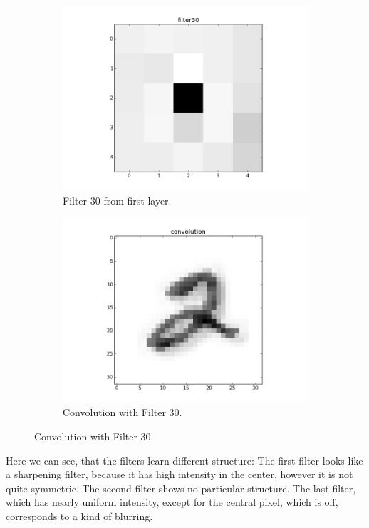 \documentclass{article}
\begin{document}
\begin{figure}[h]
	\centering
	\begin{subfigure}[b]{0.45\textwidth} 
		\includegraphics[width=\textwidth]{graphics/filt2.png}
		\caption{Filter 30 from first layer.}
		\label{fig8}
	\end{subfigure}
	\begin{subfigure}[b]{0.45\textwidth} 
		\includegraphics[width=\textwidth]{graphics/conv2.png}
		\caption{Convolution with Filter 30.}
		\label{fig9}
	\end{subfigure}
\end{figure}

\FloatBarrier

Here we can see, that the filters learn different structure: 
The first filter looks like a sharpening filter, because it has high intensity in the center, however it is not quite symmetric.
The second filter shows no particular structure.
The last filter, which has nearly uniform intensity, except for the central pixel, which is off, corresponds to a kind of blurring.
\end{document}
